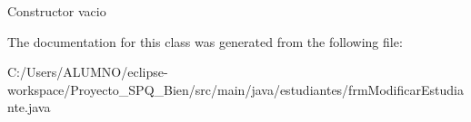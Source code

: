 Constructor vacio 

The documentation for this class was generated from the following file\+:\begin{DoxyCompactItemize}
\item 
C\+:/\+Users/\+A\+L\+U\+M\+N\+O/eclipse-\/workspace/\+Proyecto\+\_\+\+S\+P\+Q\+\_\+Bien/src/main/java/estudiantes/frm\+Modificar\+Estudiante.\+java\end{DoxyCompactItemize}
